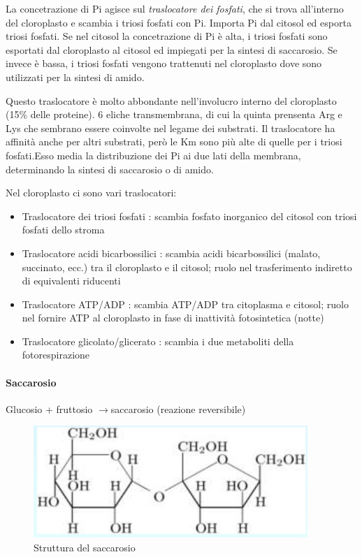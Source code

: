 \documentclass[a4paper,12pt]{book}
\newcommand{\lfreccia}{\ensuremath{\longrightarrow}}
\begin{document}
La concetrazione di Pi agisce sul \emph{traslocatore dei fosfati}, che si trova all'interno del cloroplasto e scambia i triosi fosfati con Pi. Importa Pi dal citosol ed esporta triosi fosfati. Se nel citosol la concetrazione di Pi è alta, i triosi fosfati sono esportati dal cloroplasto al citosol ed impiegati per la sintesi di saccarosio. Se invece è bassa, i triosi fosfati vengono trattenuti nel cloroplasto dove sono utilizzati per la sintesi di amido.

Questo traslocatore è molto abbondante nell'involucro interno del cloroplasto (15\% delle proteine). 6 eliche transmembrana, di cui la quinta prensenta Arg e Lys che sembrano essere coinvolte nel legame dei substrati. Il traslocatore ha affinità anche per altri substrati, però le Km sono più alte di quelle per i triosi fosfati.Esso media la distribuzione dei Pi ai due lati della membrana, determinando la sintesi di saccarosio o di amido.

Nel cloroplasto ci sono vari traslocatori:
\begin{itemize}
\item{Traslocatore dei triosi fosfati : scambia fosfato inorganico del citosol con triosi fosfati dello stroma}
\item{Traslocatore acidi bicarbossilici : scambia acidi bicarbossilici (malato, succinato, ecc.) tra il
cloroplasto e il citosol; ruolo nel trasferimento indiretto di equivalenti riducenti}
\item{Traslocatore ATP/ADP : scambia ATP/ADP tra citoplasma e citosol; ruolo nel fornire ATP al
cloroplasto in fase di inattività fotosintetica (notte)}
\item{Traslocatore glicolato/glicerato : scambia i due metaboliti della fotorespirazione}
\end{itemize}
\paragraph{Saccarosio}
Glucosio + fruttosio \lfreccia saccarosio (reazione reversibile)
\begin{figure}[H]
\centering
\includegraphics[scale=0.4]{immagini/saccarosio.jpg}
\caption{Struttura del saccarosio}
\end{figure}
\end{document}
